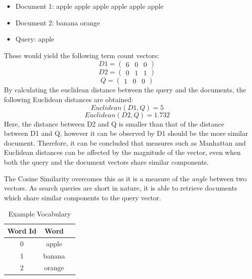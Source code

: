\documentclass[sigconf,nonacm=true]{acmart}
\begin{document}
\begin{itemize}
	\item Document 1: apple apple apple apple apple apple 
	\item Document 2: banana orange
	\item Query: apple
\end{itemize}
These would yield the following term count vectors:
\begin{displaymath}
	D1 = \begin{pmatrix}6 & 0 & 0\end{pmatrix}
\end{displaymath}
\begin{displaymath}
	D2 = \begin{pmatrix}0 & 1 & 1\end{pmatrix}
\end{displaymath}
\begin{displaymath}
	Q = \begin{pmatrix}1 & 0 & 0\end{pmatrix}
\end{displaymath}
By calculating the euclidean distance between the query and the documents,
the following Euclidean distances are obtained:
\begin{displaymath}
	Euclidean(D1,Q) = 5
\end{displaymath}
\begin{displaymath}
	Euclidean(D2,Q) = 1.732
\end{displaymath}
Here, the distance between D2 and Q is smaller than that of the distance
between D1 and Q, however it can be observed by D1 should be the more similar
document. Therefore, it can be concluded that measures such as Manhattan and
Euclidean distances can be affected by the magnitude of the vector, even when
both the query and the document vectors share similar components.

The Cosine Similarity overcomes this as it is a measure of the \textit{angle}
between two vectors. As search queries are short in nature, it is able to retrieve
documents which share similar components to the query vector.

\begin{table}
	\begin{tabular}{ccl}
		\toprule
		Word Id&Word\\
		\midrule
		0 & apple\\
		1 & banana\\
		2 & orange\\
		\bottomrule
	\end{tabular}
	\caption{Example Vocabulary}
	\label{tab:vocab}
\end{table}
\end{document}
